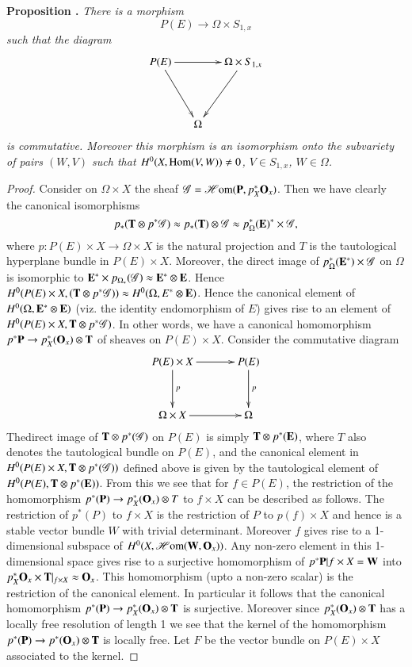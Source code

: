 \medskip
\noindent
{\bf Proposition .\label{art17-prop7.1}}
{\em There is a morphism}
$$
P(E)\to \Omega\times S_{1,x}
$$
{\em such that the diagram}
\[
\xymatrix@C=.5cm@R=1.5cm{
P(E)\ar[rr]\ar[dr] & & \Omega\times S_{1,x}\ar[dl]\\
 & \Omega &
}
\]
{\em is commutative. Moreover this morphism is an isomorphism onto the subvariety of pairs $(W,V)$ such that $H^{0}(X,\operatorname{\mathrm{Hom}}(V,W))\neq 0$, $V\in S_{1,x}$, $W\in \Omega$.}

\begin{proof}
Consider on $\Omega\times X$ the sheaf $\mathscr{G}=\operatorname{\mathscr{H}\mathrm{om}} (\mathbf{P},p^{*}_{X}\mathbf{O}_{x})$. Then we have clearly the canonical isomorphisms
$$
p_{*}(\mathbf{T}\otimes p^{*}\mathscr{G})\approx p_{*}(\mathbf{T})\otimes \mathscr{G}\approx p^{*}_{\Omega}(\mathbf{E})^{*}\times \mathscr{G},
$$
where $p:P(E)\times X\to \Omega\times X$ is the natural projection and $T$ is the tautological hyperplane bundle in $P(E)\times X$. Moreover, the direct image of $p^{*}_{\Omega}(\mathbf{E}^{*})\times \mathscr{G}$ on $\Omega$ is isomorphic to $\mathbf{E}^{*}\times p_{\Omega_{*}}(\mathscr{G})\approx \mathbf{E}^{*}\otimes \mathbf{E}$. Hence $H^{0}(P(E)\times X, (\mathbf{T}\otimes p^{*}\mathscr{G}))\approx H^{0}(\Omega,E^{*}\otimes \mathbf{E})$. Hence the canonical element of $H^{0}(\Omega,\mathbf{E}^{*}\otimes \mathbf{E})$ (viz. the identity endomorphism of $E$) gives rise to an element of $H^{0}(P(E)\times X,\mathbf{T}\otimes p^{*}\mathscr{G})$. In other words, we have a canonical homomorphism $p^{*}\mathbf{P}\to p^{*}_{X}(\mathbf{O}_{x})\otimes \mathbf{T}$ of sheaves on $P(E)\times X$. Consider the commutative diagram
\[
\xymatrix@=1.2cm{
P(E)\times X\ar[d]^-{p}\ar[r] & P(E)\ar[d]^-{p}\\
\Omega\times X\ar[r] & \Omega
}
\]
The\pageoriginale direct image of $\mathbf{T}\otimes p^{*}(\mathscr{G})$ on $P(E)$ is simply $\mathbf{T}\otimes p^{*}(\mathbf{E})$, where $T$ also denotes the tautological bundle on $P(E)$, and the canonical element in $H^{0}(P(E)\times X,\mathbf{T}\otimes p^{*}(\mathscr{G}))$ defined above is given by the tautological element of $H^{0}(P(E),\mathbf{T}\otimes p^{*}(\mathbf{E}))$. From this we see that for $f\in P(E)$, the restriction of the homomorphism $p^{*}(\mathbf{P})\to p^{*}_{X}(\mathbf{O}_{x})\otimes T$ to $f\times X$ can be described as follows. The restriction of $p^{*}(P)$ to $f\times X$ is the restriction of $P$ to $p(f)\times X$ and hence is a stable vector bundle $W$ with trivial determinant. Moreover $f$ gives rise to a 1-dimensional subspace of $H^{0}(X,\operatorname{\mathscr{H}\mathrm{om}}(\mathbf{W},\mathbf{O}_{x}))$. Any non-zero element in this 1-dimensional space gives rise to a surjective homomorphism of $p^{*}\mathbf{P}|f\times X=\mathbf{W}$ into $p^{*}_{X}\mathbf{O}_{x}\times \mathbf{T}|_{f\times X}\approx \mathbf{O}_{x}$. This homomorphism (upto a non-zero scalar) is the restriction of the canonical element. In particular it follows that the canonical homomorphism $p^{*}(\mathbf{P})\to p^{*}_{X}(\mathbf{O}_{x})\otimes \mathbf{T}$ is surjective. Moreover since $p^{*}_{X}(\mathbf{O}_{x})\otimes \mathbf{T}$ has a locally free resolution of length 1 we see that the kernel of the homomorphism $p^{*}(\mathbf{P})\to p^{*}(\mathbf{O}_{x})\otimes \mathbf{T}$ is locally free. Let $F$ be the vector bundle on $P(E)\times X$ associated to the kernel.
\end{proof}

